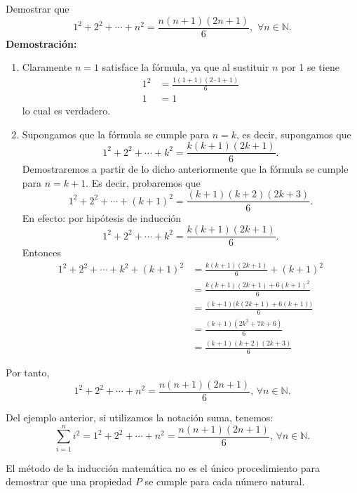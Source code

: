 \begin{myexample}\label{EX:APUDJSKS}
    Demostrar que
    $$1^2+2^2+\cdots +n^2=\frac{n(n+1)(2n+1)}{6}, \,\, \forall n \in \mathbb{N}.$$
    \tcblower
    \textbf{\color{jblueleft}Demostración:}
    \begin{enumerate}[label=\roman*)]
        \item Claramente $n=1$ satisface la fórmula, ya que al sustituir $n$ por 1 se tiene
        \begin{align*}
            1^2 &=\frac{1(1+1)(2\cdot 1+1)}{6} \\
            1 &=1
        \end{align*}
        lo cual es verdadero.
        \item Supongamos que la fórmula se cumple para $n=k$, es decir, supongamos que
        $$1^2+2^2+\cdots +k^2=\frac{k(k+1)(2k+1)}{6}.$$
        Demostraremos a partir de lo dicho anteriormente que la fórmula se cumple para $n=k+1$. Es decir, probaremos que
        $$1^2+2^2+\cdots +(k+1)^2=\frac{(k+1)(k+2)(2k+3)}{6}.$$
        En efecto: por hipótesis de inducción
        $$1^2+2^2+\cdots +k^2=\frac{k(k+1)(2k+1)}{6}.$$
        Entonces
        \begin{align*}
            1^2 +2^2+\cdots +k^2+(k+1)^2 &=\frac{k(k+1)(2k+1)}{6}+(k+1)^2 \\
            &=\frac{k(k+1)(2k+1)+6(k+1)^2}{6} \\
            &=\frac{(k+1)\big(k(2k+1)+6(k+1)\big)}{6} \\
            &=\frac{(k+1)(2k^2+7k+6)}{6} \\
            &=\frac{(k+1)(k+2)(2k+3)}{6}
        \end{align*}
    \end{enumerate}
    Por tanto,
    $$1^2+2^2+\cdots +n^2=\frac{n(n+1)(2n+1)}{6}, \, \forall n \in \mathbb{N}.$$
\end{myexample}

\newpage

\begin{BOX}
    Del ejemplo anterior, si utilizamos la notación suma, tenemos:
    $$\sum_{i=1}^n i^2 = 1^2+2^2+\cdots +n^2=\frac{n(n+1)(2n+1)}{6}, \, \forall n \in \mathbb{N}.$$
\end{BOX}

\begin{importante}
    El método de la inducción matemática no es el único procedimiento para demostrar que una propiedad $P$ se cumple para cada número natural.
\end{importante}

